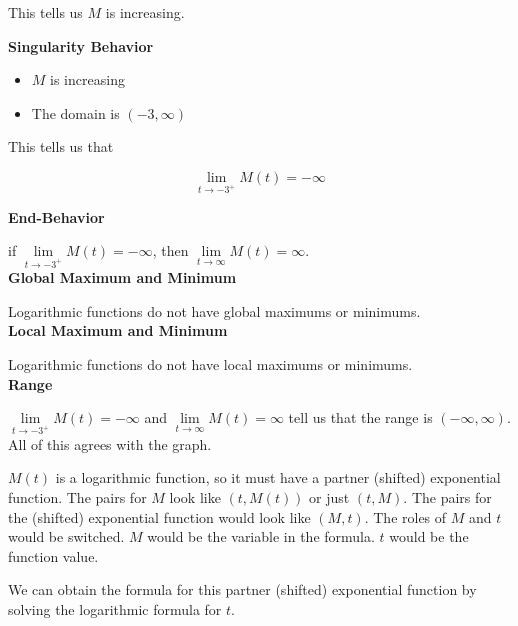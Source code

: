 \documentclass{ximera}
\begin{document}
\begin{example}
This tells us $M$ is increasing.






\textbf{Singularity Behavior}

\begin{itemize}
\item $M$ is increasing
\item The domain is $(-3, \infty)$
\end{itemize}


This tells us that

\[
\lim\limits_{t \to -3^+} M(t) = -\infty
\]





\textbf{End-Behavior}


if  $\lim\limits_{t \to -3^+} M(t) = -\infty$, then $\lim\limits_{t \to \infty} M(t) = \infty$. \\





\textbf{Global Maximum and Minimum}

Logarithmic functions do not have global maximums or minimums. \\






\textbf{Local Maximum and Minimum}

Logarithmic functions do not have local maximums or minimums. \\




\textbf{Range}



$\lim\limits_{t \to -3^+} M(t) = -\infty$ and $\lim\limits_{t \to \infty} M(t) = \infty$ tell us that the range is $(-\infty, \infty)$. \\


All of this agrees with the graph.


\end{example}



$M(t)$ is a logarithmic function, so it must have a partner (shifted) exponential function.  The pairs for $M$ look like $(t, M(t))$ or just $(t,M)$. The pairs for the (shifted) exponential function would look like $(M, t)$.  The roles of $M$ and $t$ would be switched. $M$ would be the variable in the formula. $t$ would be the function value.


We can obtain the formula for this partner (shifted) exponential function by solving the logarithmic formula for $t$.
\end{document}

